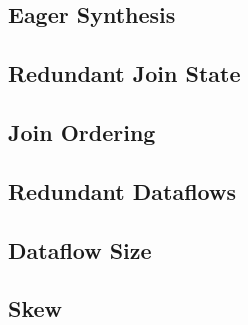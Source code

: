 \documentclass[../index.tex]{subfiles}
\begin{document}
\subsection{Eager Synthesis} \label{case-eagerness}


\subsection{Redundant Join State} \label{case-join-state}


\subsection{Join Ordering} \label{case-join-ordering}

\subsection{Redundant Dataflows} \label{case-redundant-dataflows}


\subsection{Dataflow Size} \label{case-dataflow-size}
\subsection{Skew} \label{case-skew}
\end{document}
